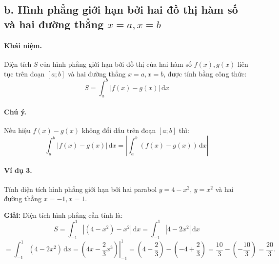 \vspace{0.5cm}

\subsection*{b. Hình phẳng giới hạn bởi hai đồ thị hàm số và hai đường thẳng $x = a, x = b$}

\paragraph{Khái niệm.} 
Diện tích $S$ của hình phẳng giới hạn bởi đồ thị của hai hàm số $f(x), g(x)$ liên tục trên đoạn $[a; b]$ và hai đường thẳng $x = a, x = b$, được tính bằng công thức:
\[
S = \int_{a}^{b} |f(x) - g(x)| \, \mathrm{d}x
\]

\paragraph{Chú ý.} Nếu hiệu $f(x) - g(x)$ không đổi dấu trên đoạn $[a; b]$ thì:
\[
\int_{a}^{b} |f(x) - g(x)| \, \mathrm{d}x = \left| \int_{a}^{b} (f(x) - g(x)) \, \mathrm{d}x \right|
\]

\paragraph{Ví dụ 3.} Tính diện tích hình phẳng giới hạn bởi hai parabol $y = 4 - x^2$, $y = x^2$ và hai đường thẳng $x = -1, x = 1$.

\noindent\textbf{Giải:}  
Diện tích hình phẳng cần tính là:
\[
S = \int_{-1}^{1} |(4 - x^2) - x^2| \, \mathrm{d}x = \int_{-1}^{1} |4 - 2x^2| \, \mathrm{d}x
\]
\[
= \int_{-1}^{1} (4 - 2x^2) \, \mathrm{d}x = \left. \left( 4x - \frac{2}{3}x^3 \right) \right|_{-1}^{1} = \left( 4 - \frac{2}{3} \right) - \left( -4 + \frac{2}{3} \right) = \frac{10}{3} - \left( -\frac{10}{3} \right) = \frac{20}{3}.
\]

\begin{center}
\end{center}


